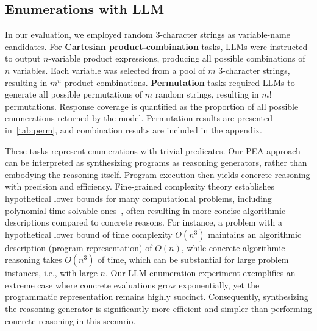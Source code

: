 \subsection{Enumerations with LLM}\label{sec:enum-llm}
In our evaluation, we employed random 3-character strings as variable-name candidates. For \textbf{Cartesian product-combination} tasks, LLMs were instructed to output $n$-variable product expressions, producing all possible combinations of $n$ variables. Each variable was selected from a pool of $m$ $3$-character strings, resulting in $m^n$ product combinations.
\textbf{Permutation} tasks required LLMs to generate all possible permutations of $m$ random strings, resulting in $m!$ permutations. Response coverage is quantified as the proportion of all possible enumerations returned by the model. Permutation results are presented in~\cref{tab:perm}, and combination results are included in the appendix.

These tasks represent enumerations with trivial predicates. Our PEA approach can be interpreted as synthesizing programs as
reasoning generators,
rather than embodying the reasoning itself. Program execution then yields concrete reasoning with precision and efficiency. Fine-grained complexity theory establishes hypothetical lower bounds for many computational problems, including polynomial-time solvable ones~\citep{Williams2019ONSF}, often resulting in more concise algorithmic descriptions compared to concrete reasons. For instance, a problem with a hypothetical lower bound of time complexity $O(n^3)$ maintains an algorithmic description (program representation) of $O(n)$, while concrete algorithmic reasoning takes $O(n^3)$ of time, which can be substantial for large problem instances, i.e.,
with large $n$.
Our LLM enumeration experiment exemplifies an extreme case where concrete evaluations grow exponentially, yet the programmatic representation remains highly succinct. Consequently, synthesizing the
reasoning generator
is significantly more efficient and simpler than 
performing
concrete reasoning in this scenario.

